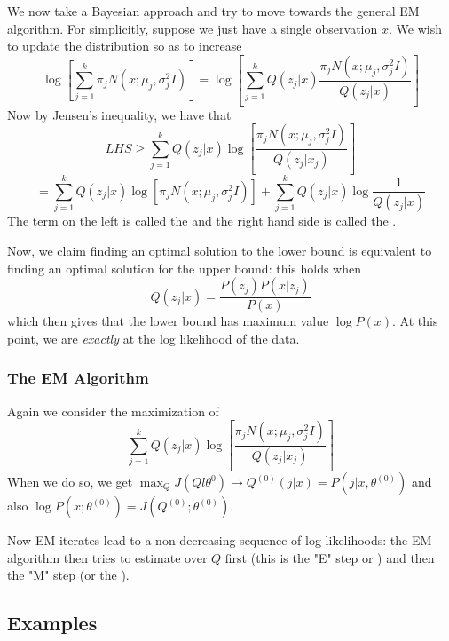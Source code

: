 \documentclass[11pt]{scrartcl}
\begin{document}
We now take a Bayesian approach and try to move towards the general EM algorithm. For simplicitly, suppose we just have a single observation $x$. We wish to update the distribution so as to increase
$$\log\left[\sum_{j=1}^{k}\pi_{j}N(x;\mu_{j},\sigma_j^2I)\right]=\log\left[\sum_{j=1}^{k}Q(z_j|x)\frac{\pi_{j}N(x;\mu_j,\sigma_j^2I)}{Q(z_j|x)}\right]$$
Now by Jensen's inequality, we have that 
$$LHS \ge \sum_{j=1}^{k}Q(z_j|x)\log\left[\frac{\pi_{j}N(x;\mu_j,\sigma^2_jI)}{Q(z_j|x_j)}\right]$$
$$=\sum_{j=1}^{k}Q(z_j|x)\log\left[{\pi_{j}N(x;\mu_j,\sigma^2_jI)}\right]+\sum_{j=1}^{k}Q(z_j|x)\log\frac{1}{Q(z_j|x)}$$
The term on the left is called the  and the right hand side is called the . 

Now, we claim finding an optimal solution to the lower bound is equivalent to finding an optimal solution for the upper bound: this holds when $$Q(z_j|x)=\frac{P(z_j)P(x|z_j)}{P(x)}$$ which then gives that the lower bound has maximum value $\log{P(x)}$. At this point, we are \textit{exactly} at the log likelihood of the data.

\subsubsection{The EM Algorithm}
Again we consider the maximization of 
$$\sum_{j=1}^{k}Q(z_j|x)\log\left[\frac{\pi_{j}N(x;\mu_j,\sigma^2_jI)}{Q(z_j|x_j)}\right]$$
When we do so, we get $\max_{Q}J(Ql\theta^{0}) \to Q^{(0)}(j|x)=P(j|x,\theta^{(0)})$ and also $\log{P(x;\theta^{(0)})}=J(Q^{(0)};\theta^{(0)})$. 

Now EM iterates lead to a non-decreasing sequence of log-likelihoods:
the EM algorithm then tries to estimate over $Q$ first (this is the "E" step or ) and then the "M" step (or the ).

\subsection{Examples}
\end{document}
